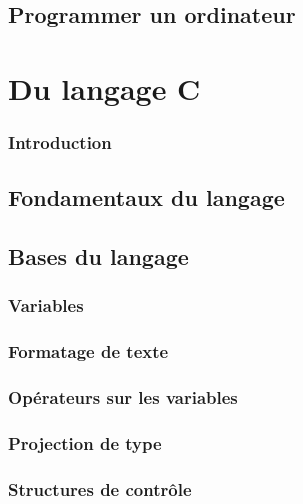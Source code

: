 \documentclass{minitelreport}
\begin{document}
\begin{refsection}
	\chapter{Programmer un ordinateur}
		\label{cha:programmer_un_ordinateur}
		
\part{Du langage C}
\label{part:du_langage_c}
	\section*{Introduction}
	
	\chapter{Fondamentaux du langage}
	\label{chap:fondamentaux_du_langage}
		
	\chapter{Bases du langage}
	\label{chap:bases_du_langage}
		\section{Variables}
			\label{sec:variables}
			
		\section{Formatage de texte}
			\label{sec:formatage_du_texte}
			
		\section{Opérateurs sur les variables}
			\label{sec:operateurs_variables}
			
		\section{Projection de type}
			\label{sec:projection_type}
			
		\section{Structures de contrôle}
			\label{sec:structures_controle}
			

\end{refsection}
\end{document}
